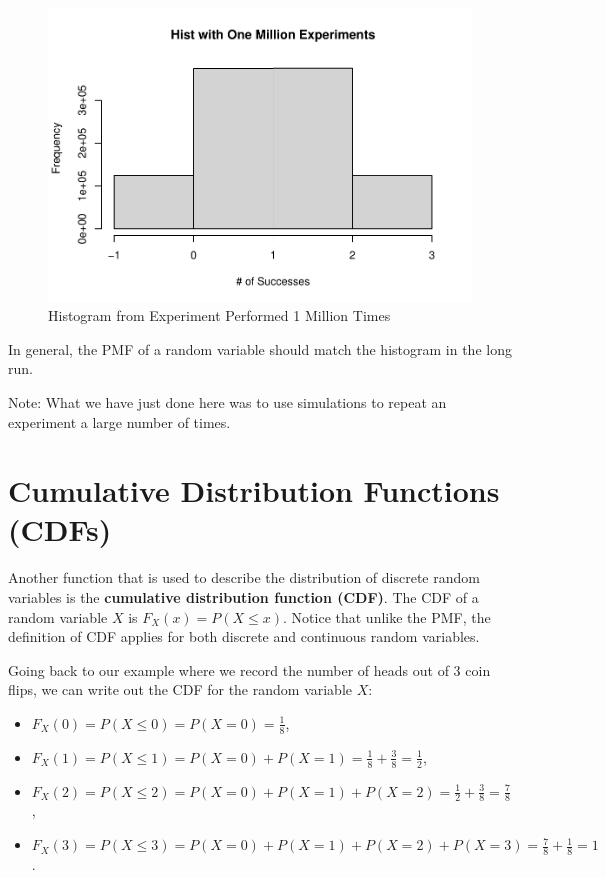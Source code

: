 \documentclass[
]{book}
\providecommand{\tightlist}{%
  \setlength{\itemsep}{0pt}\setlength{\parskip}{0pt}}
\begin{document}
\begin{figure}
\centering
\includegraphics{bookdown-demo_files/figure-latex/3-sim-1.pdf}
\caption{\label{fig:3-sim}Histogram from Experiment Performed 1 Million Times}
\end{figure}

In general, the PMF of a random variable should match the histogram in the long run.

Note: What we have just done here was to use simulations to repeat an experiment a large number of times.

\section{Cumulative Distribution Functions (CDFs)}\label{cumulative-distribution-functions-cdfs}

Another function that is used to describe the distribution of discrete random variables is the \textbf{cumulative distribution function (CDF)}. The CDF of a random variable \(X\) is \(F_X(x) = P(X \leq x)\). Notice that unlike the PMF, the definition of CDF applies for both discrete and continuous random variables.

Going back to our example where we record the number of heads out of 3 coin flips, we can write out the CDF for the random variable \(X\):

\begin{itemize}
\tightlist
\item
  \(F_X(0) = P(X \leq 0) = P(X=0) = \frac{1}{8}\),
\item
  \(F_X(1) = P(X \leq 1) = P(X=0) + P(X=1) = \frac{1}{8} +  \frac{3}{8} = \frac{1}{2}\),
\item
  \(F_X(2) = P(X \leq 2) = P(X=0) + P(X=1) + P(X=2) = \frac{1}{2} + \frac{3}{8} = \frac{7}{8}\),
\item
  \(F_X(3) = P(X \leq 3) = P(X=0) + P(X=1) + P(X=2) + P(X=3) = \frac{7}{8} + \frac{1}{8} = 1\).
\end{itemize}
\end{document}

